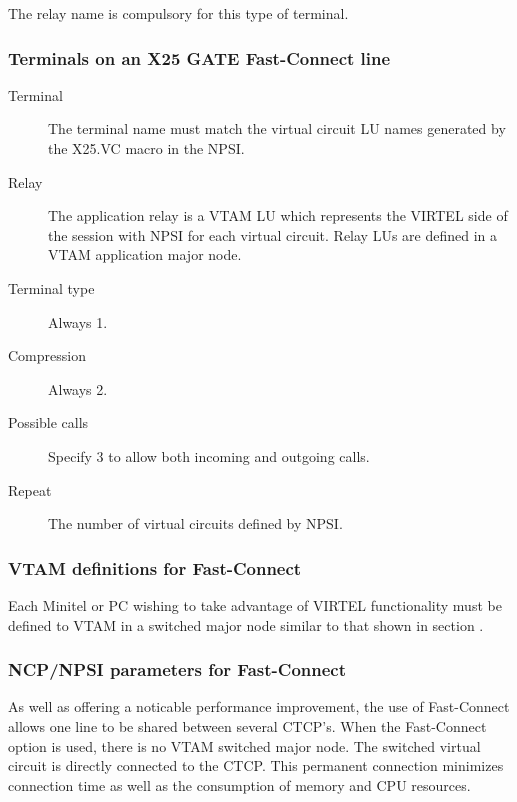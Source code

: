 \documentclass[letterpaper,10pt,english]{sphinxmanual}
\begin{document}
The relay name is compulsory for this type of terminal.



\subsubsection{Terminals on an X25 GATE Fast-Connect line}
\label{\detokenize{connectivity_guide:terminals-on-an-x25-gate-fast-connect-line}}\begin{description}
\item[{Terminal}] \leavevmode
The terminal name must match the virtual circuit LU names generated
by the X25.VC macro in the NPSI.

\item[{Relay}] \leavevmode
The application relay is a VTAM LU which represents the VIRTEL side
of the session with NPSI for each virtual circuit. Relay LUs are
defined in a VTAM application major node.

\item[{Terminal type}] \leavevmode
Always 1.

\item[{Compression}] \leavevmode
Always 2.

\item[{Possible calls}] \leavevmode
Specify 3 to allow both incoming and outgoing calls.

\item[{Repeat}] \leavevmode
The number of virtual circuits defined by NPSI.

\end{description}


\subsubsection{VTAM definitions for Fast-Connect}
\label{\detokenize{connectivity_guide:vtam-definitions-for-fast-connect}}
Each Minitel or PC wishing to take advantage of VIRTEL functionality must be defined to VTAM in a switched major node similar to that shown in section {\hyperref[\detokenize{connectivity_guide:bookmark94}]{}}.


\subsubsection{NCP/NPSI parameters for Fast-Connect}
\label{\detokenize{connectivity_guide:ncp-npsi-parameters-for-fast-connect}}
As well as offering a noticable performance improvement, the use of Fast-Connect allows one line to be shared between several CTCP’s. When the Fast-Connect option is used, there is no VTAM switched major node. The switched virtual circuit is directly connected to the CTCP. This permanent connection minimizes connection time as well as the consumption of memory and CPU resources.
\end{document}

